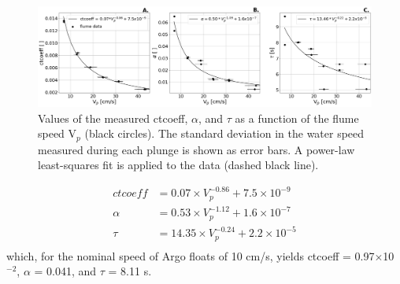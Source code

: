 \documentclass{ametsocV6.1}
\begin{document}
\begin{figure}[t]
	\centering
	\includegraphics[width=\linewidth]{Fig11_TM_vs_speed}
	\caption{Values of the measured ctcoeff, $\alpha$, and $\tau$ as a function of the flume speed V$_p$ (black circles). The standard deviation in the water speed measured during each plunge is shown as error bars. A power-law least-squares fit is applied to the data (dashed black line).}
	\label{fig: TM_vs_speed}
\end{figure}


\begin{align*}
	\label{eq: TM_vs_speed}
	ctcoeff &= 0.07 \times V_p^{-0.86} + 7.5\times10^{-9}\\
	\alpha &= 0.53 \times V_p^{-1.12}+ 1.6\times10^{-7}\\
	\tau &= 14.35 \times V_p^{-0.24}+ 2.2\times10^{-5}\\
\end{align*}
which, for the nominal speed of Argo floats of 10 cm/s, yields ctcoeff = 0.97$\times$10$^{-2}$, $\alpha$ = 0.041, and $\tau$ = 8.11 s. 

%
\end{document}
